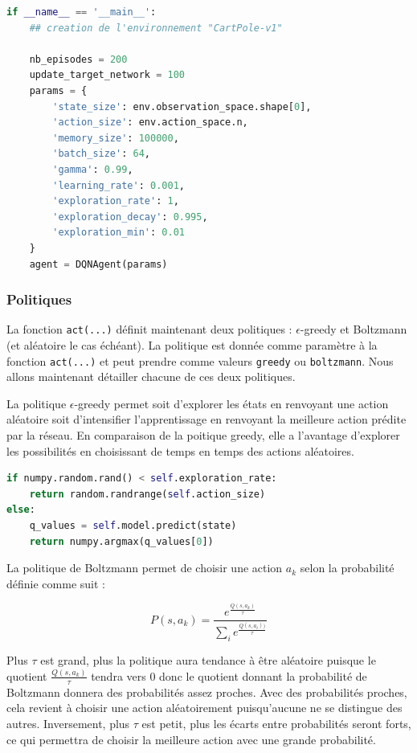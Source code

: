 \documentclass[10pt,a4paper]{article}
\begin{document}
\begin{lstlisting}[language=Python, caption=Paramétrage de l'agent DQN]
if __name__ == '__main__':
    ## creation de l'environnement "CartPole-v1"
    
    nb_episodes = 200
    update_target_network = 100
    params = {
        'state_size': env.observation_space.shape[0],
        'action_size': env.action_space.n,
        'memory_size': 100000,
        'batch_size': 64,
        'gamma': 0.99,
        'learning_rate': 0.001,
        'exploration_rate': 1,
        'exploration_decay': 0.995,
        'exploration_min': 0.01
    }
    agent = DQNAgent(params)
\end{lstlisting}

\subsubsection{Politiques} \label{politiquesDQN}

La fonction \lstinline{act(...)} définit maintenant deux politiques : $\epsilon$-greedy et Boltzmann (et aléatoire le cas échéant). La politique est donnée comme paramètre à la fonction \lstinline{act(...)} et peut prendre comme valeurs \lstinline{greedy} ou \lstinline{boltzmann}. Nous allons maintenant détailler chacune de ces deux politiques.

La politique $\epsilon$-greedy permet soit d'explorer les états en renvoyant une action aléatoire soit d'intensifier l'apprentissage en renvoyant la meilleure action prédite par la réseau. En comparaison de la poitique greedy, elle a l'avantage d'explorer les possibilités en choisissant de temps en temps des actions aléatoires.
\begin{lstlisting}[language=Python, caption=Politique e-greedy]
if numpy.random.rand() < self.exploration_rate:
    return random.randrange(self.action_size)
else:
    q_values = self.model.predict(state)
    return numpy.argmax(q_values[0])
\end{lstlisting}    

La politique de Boltzmann permet de choisir une action $a_k$ selon la probabilité définie comme suit :

 $$P(s, a_k) = \frac{e^{\frac{Q(s,a_k)}{\tau}}}{\sum_ie^{\frac{Q(s,a_i))}{\tau}}}$$
 
Plus $\tau$ est grand, plus la politique aura tendance à être aléatoire puisque le quotient $\frac{Q(s,a_k)}{\tau}$ tendra vers 0 donc le quotient donnant la probabilité de Boltzmann donnera des probabilités assez proches. Avec des probabilités proches, cela revient à choisir une action aléatoirement puisqu'aucune ne se distingue des autres. Inversement, plus $\tau$ est petit, plus les écarts entre probabilités seront forts, ce qui permettra de choisir la meilleure action avec une grande probabilité.
\end{document}
